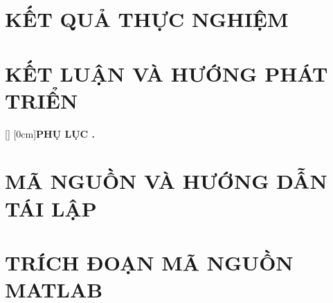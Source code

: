 \documentclass[a4paper,oneside]{report}
\renewcommand{\_}{\textunderscore\allowbreak}
\theoremstyle{definition}
\begin{document}
\chapter{KẾT QUẢ THỰC NGHIỆM}


\chapter{KẾT LUẬN VÀ HƯỚNG PHÁT TRIỂN}


\clearpage
{}



\clearpage
\renewcommand\appendixname{PHỤ LỤC}
\renewcommand\appendixpagename{PHỤ LỤC}
\renewcommand\appendixtocname{PHỤ LỤC}
\appendix
{}[]
[0cm]{\bfseries\vspace{0.3cm}}{{\bfseries PHỤ LỤC \thecontentslabel.\ }}{}{\contentspage}
\renewcommand{\chaptermark}[1]{\markboth{PHỤ LỤC \thechapter. #1}{}}

\chapter{MÃ NGUỒN VÀ HƯỚNG DẪN TÁI LẬP}\label{app:repro}


\chapter{TRÍCH ĐOẠN MÃ NGUỒN MATLAB}\label{app:code}

\end{document}
